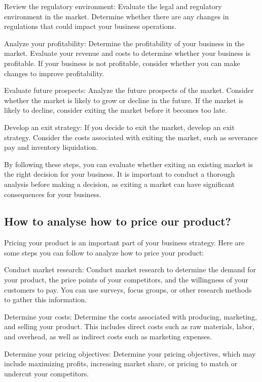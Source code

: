 \documentclass[12pt, a4paper, oneside]{article}
\begin{document}
Review the regulatory environment: Evaluate the legal and regulatory environment in the market. Determine whether there are any changes in regulations that could impact your business operations.

Analyze your profitability: Determine the profitability of your business in the market. Evaluate your revenue and costs to determine whether your business is profitable. If your business is not profitable, consider whether you can make changes to improve profitability.

Evaluate future prospects: Analyze the future prospects of the market. Consider whether the market is likely to grow or decline in the future. If the market is likely to decline, consider exiting the market before it becomes too late.

Develop an exit strategy: If you decide to exit the market, develop an exit strategy. Consider the costs associated with exiting the market, such as severance pay and inventory liquidation.

By following these steps, you can evaluate whether exiting an existing market is the right decision for your business. It is important to conduct a thorough analysis before making a decision, as exiting a market can have significant consequences for your business.







\subsection{ How to analyse how to price our product? }
Pricing your product is an important part of your business strategy. Here are some steps you can follow to analyze how to price your product:

Conduct market research: Conduct market research to determine the demand for your product, the price points of your competitors, and the willingness of your customers to pay. You can use surveys, focus groups, or other research methods to gather this information.

Determine your costs: Determine the costs associated with producing, marketing, and selling your product. This includes direct costs such as raw materials, labor, and overhead, as well as indirect costs such as marketing expenses.

Determine your pricing objectives: Determine your pricing objectives, which may include maximizing profits, increasing market share, or pricing to match or undercut your competitors.
\end{document}
